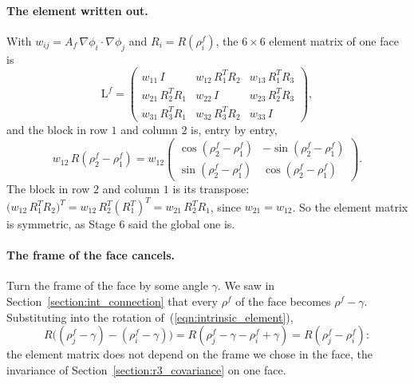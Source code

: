 \paragraph{The element written out.} With $w_{ij} = A_f\,\nabla\phi_i\cdot\nabla\phi_j$ and $R_i = R(\rho_i^f)$, the $6\times 6$ element matrix of one face is
\begin{equation*}
\mathrm L^f = \begin{pmatrix}
w_{11}\, I & w_{12}\, R_1^TR_2 & w_{13}\, R_1^TR_3 \\
w_{21}\, R_2^TR_1 & w_{22}\, I & w_{23}\, R_2^TR_3 \\
w_{31}\, R_3^TR_1 & w_{32}\, R_3^TR_2 & w_{33}\, I
\end{pmatrix} ,
\end{equation*}
and the block in row $1$ and column $2$ is, entry by entry,
\begin{equation*}
w_{12}\, R(\rho_2^f - \rho_1^f) = w_{12}\begin{pmatrix} \cos(\rho_2^f - \rho_1^f) & -\sin(\rho_2^f - \rho_1^f) \\ \sin(\rho_2^f - \rho_1^f) & \cos(\rho_2^f - \rho_1^f)\end{pmatrix} .
\end{equation*}
The block in row $2$ and column $1$ is its transpose: $\big(w_{12}\, R_1^TR_2\big)^T = w_{12}\, R_2^T(R_1^T)^T = w_{21}\, R_2^TR_1$, since $w_{21} = w_{12}$. So the element matrix is symmetric, as Stage 6 said the global one is.

\paragraph{The frame of the face cancels.} Turn the frame of the face by some angle $\gamma$. We saw in Section~\ref{section:int_connection} that every $\rho^f$ of the face becomes $\rho^f - \gamma$. Substituting into the rotation of~(\ref{eqn:intrinsic_element}),
\begin{equation*}
R\big((\rho_j^f - \gamma) - (\rho_i^f - \gamma)\big) = R(\rho_j^f - \gamma - \rho_i^f + \gamma) = R(\rho_j^f - \rho_i^f) :
\end{equation*}
the element matrix does not depend on the frame we chose in the face, the invariance of Section~\ref{section:r3_covariance} on one face.

